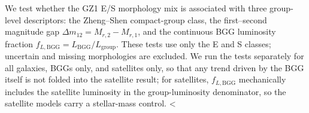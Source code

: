 \documentclass{aa}
\newcommand{\CC}{Control\textsubscript{4C}}
\newcommand{\CG}{CG\textsubscript{4}}
\newcommand{\RG}{RG\textsubscript{4}}
\begin{document}
\begin{appendix}
We test whether the GZ1 E/S morphology mix is associated with three group-level descriptors: the Zheng--Shen compact-group class, the first--second magnitude gap \(\Delta m_{12}=M_{r,2}-M_{r,1}\), and the continuous BGG luminosity fraction \(f_{L,\mathrm{BGG}}=L_\mathrm{BGG}/L_\mathrm{group}\). These tests use only the E and S classes; uncertain and missing morphologies are excluded. We run the tests separately for all galaxies, BGGs only, and satellites only, so that any trend driven by the BGG itself is not folded into the satellite result; for satellites, \(f_{L,\mathrm{BGG}}\) mechanically includes the satellite luminosity in the group-luminosity denominator, so the satellite models carry a stellar-mass control. <%


\end{appendix}
\end{document}
